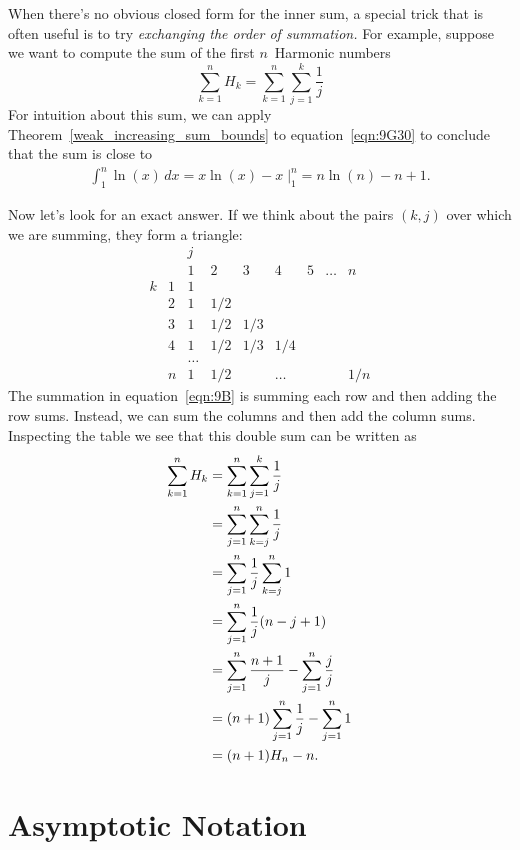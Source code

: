 When there's no obvious closed form for the inner sum, a special trick
that is often useful is to try \emph{exchanging the order of
  summation.}  For example, suppose we want to compute the sum of the
first $n$~Harmonic numbers
\begin{equation}\label{eqn:9B}
    \sum_{k=1}^n H_k = \sum_{k=1}^n \sum_{j=1}^k \frac{1}{j}
\end{equation}
For intuition about this sum, we can apply Theorem~\ref{weak_increasing_sum_bounds} to
equation~\ref{eqn:9G30} to conclude that the sum is close to
\begin{align*}
\int_{1}^n \ln(x) \, dx
    =  x \ln(x) - x \; \Bigr|_1^n %
    = n \ln(n) - n + 1.
\end{align*}

Now let's look for an exact answer.  If we think about the pairs
$(k,j)$ over which we are summing, they form a triangle:
\[
\begin{array}{cc|ccccccc}
 &  & j &   &   &   &   &       &   \\
 &  & 1 & 2 & 3 & 4 & 5 & \dots & n \\
\hline
k & 1 & 1\\
  & 2 &1&1/2\\
  & 3 &1&1/2&1/3\\
  & 4 &1&1/2&1/3&1/4\\
  &   &\dots\\
  & n &1&1/2&&\dots&&&1/n
\end{array}
\]
The summation in equation~\ref{eqn:9B} is summing each row and then
adding the row sums.  Instead, we can sum the columns and then add the
column sums.  Inspecting the table we see that this double sum can be
written as
\begingroup
{}
\begin{align}
\sum_{k=1}^n H_k &= \sum_{k=1}^n \sum_{j=1}^k \frac{1}{j}\notag\\
&= \sum_{j=1}^n \sum_{k=j}^n \frac{1}{j}\notag\\
&= \sum_{j=1}^n \frac{1}{j} \sum_{k=j}^n 1\notag\\
&= \sum_{j=1}^n \frac1j (n-j+1)\notag\\
&= \sum_{j=1}^n \frac{n+1}j - \sum_{j=1}^n \frac{j}{j}\notag\\
&= (n+1)\sum_{j=1}^n \frac1j - \sum_{j=1}^n 1\notag\\
&= (n+1)H_n-n.\label{sHk}
\end{align}
\endgroup


\section{Asymptotic Notation}\label{asymptotic_sec}

